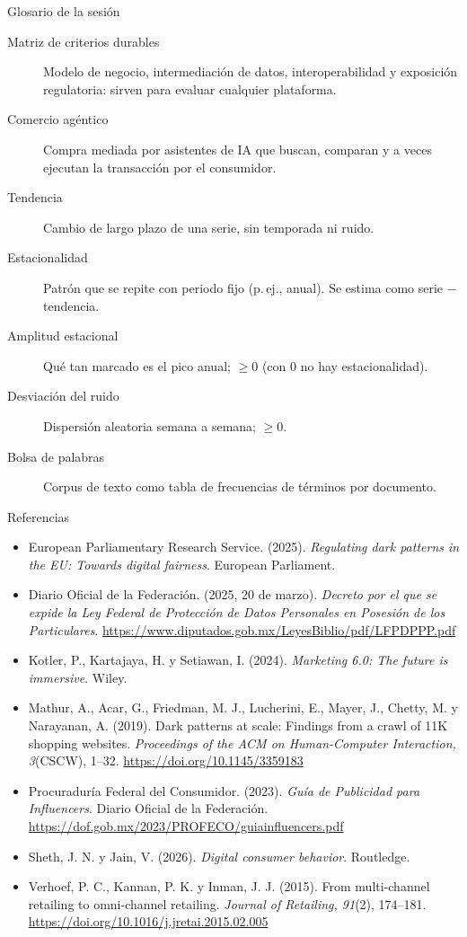 \documentclass[aspectratio=169,xcolor=dvipsnames]{beamer}
\begin{document}
\begin{frame}{Glosario de la sesión}
\scriptsize
\begin{description}
  \item[Matriz de criterios durables] Modelo de negocio, intermediación de datos, interoperabilidad y exposición regulatoria: sirven para evaluar cualquier plataforma.
  \item[Comercio agéntico] Compra mediada por asistentes de IA que buscan, comparan y a veces ejecutan la transacción por el consumidor.
  \item[Tendencia] Cambio de largo plazo de una serie, sin temporada ni ruido.
  \item[Estacionalidad] Patrón que se repite con periodo fijo (p.\,ej., anual). Se estima como serie $-$ tendencia.
  \item[Amplitud estacional] Qué tan marcado es el pico anual; $\geq 0$ (con 0 no hay estacionalidad).
  \item[Desviación del ruido] Dispersión aleatoria semana a semana; $\geq 0$.
  \item[Bolsa de palabras] Corpus de texto como tabla de frecuencias de términos por documento.
\end{description}
\end{frame}

\begin{frame}{Referencias}
\tiny
\begin{itemize}
  \item[] European Parliamentary Research Service. (2025). \textit{Regulating dark patterns in the EU: Towards digital fairness}. European Parliament.
  \item[] Diario Oficial de la Federación. (2025, 20 de marzo). \textit{Decreto por el que se expide la Ley Federal de Protección de Datos Personales en Posesión de los Particulares}. \url{https://www.diputados.gob.mx/LeyesBiblio/pdf/LFPDPPP.pdf}
  \item[] Kotler, P., Kartajaya, H. y Setiawan, I. (2024). \textit{Marketing 6.0: The future is immersive}. Wiley.
  \item[] Mathur, A., Acar, G., Friedman, M. J., Lucherini, E., Mayer, J., Chetty, M. y Narayanan, A. (2019). Dark patterns at scale: Findings from a crawl of 11K shopping websites. \textit{Proceedings of the ACM on Human-Computer Interaction, 3}(CSCW), 1--32. \url{https://doi.org/10.1145/3359183}
  \item[] Procuraduría Federal del Consumidor. (2023). \textit{Guía de Publicidad para Influencers}. Diario Oficial de la Federación. \url{https://dof.gob.mx/2023/PROFECO/guiainfluencers.pdf}
  \item[] Sheth, J. N. y Jain, V. (2026). \textit{Digital consumer behavior}. Routledge.
  \item[] Verhoef, P. C., Kannan, P. K. y Inman, J. J. (2015). From multi-channel retailing to omni-channel retailing. \textit{Journal of Retailing, 91}(2), 174--181. \url{https://doi.org/10.1016/j.jretai.2015.02.005}
\end{itemize}
\end{frame}
\end{document}
